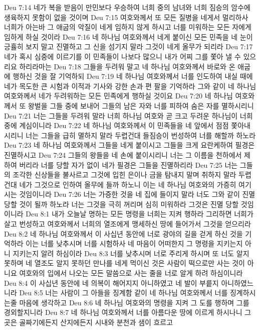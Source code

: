 Deu 7:14  네가 복을 받음이 만민보다 우승하여 너희 중의 남녀와 너희 짐승의 암수에 생육하지 못함이 없을 것이며
Deu 7:15  여호와께서 또 모든 질병을 네게서 멀리하사 너희가 아는바 그 애굽의 악질이 네게 임하지 않게 하시고 너를 미워하는 모든 자에게 임하게 하실 것이라
Deu 7:16  네 하나님 여호와께서 네게 붙이신 모든 민족을 네 눈이 긍휼히 보지 말고 진멸하고 그 신을 섬기지 말라 그것이 네게 올무가 되리라
Deu 7:17  네가 혹시 심중에 이르기를 이 민족들이 나보다 많으니 내가 어찌 그를 쫓아 낼 수 있으리요 하리라마는
Deu 7:18  그들을 두려워 말고 네 하나님 여호와께서 바로와 온 애굽에 행하신 것을 잘 기억하되
Deu 7:19  네 하나님 여호와께서 너를 인도하여 내실 때에 네가 목도한 큰 시험과 이적과 기사와 강한 손과 편 팔을 기억하라 그와 같이 네 하나님 여호와께서 네가 두려워하는 모든 민족에게 행하실 것이요
Deu 7:20  네 하나님 여호와께서 또 왕벌을 그들 중에 보내어 그들의 남은 자와 너를 피하여 숨은 자를 멸하시리니
Deu 7:21  너는 그들을 두려워 말라 너희 하나님 여호와 곧 크고 두려운 하나님이 너희 중에 계심이니라
Deu 7:22  네 하나님 여호와께서 이 민족들을 네 앞에서 점점 쫓아내시리니 너는 그들을 급히 멸하지 말라 두렵건대 들짐승이 번성하여 너를 해할까 하노라
Deu 7:23  네 하나님 여호와께서 그들을 네게 붙이시고 그들을 크게 요란케하여 필경은 진멸하시고
Deu 7:24  그들의 왕들을 네 손에 붙이시리니 너는 그 이름을 천하에서 제하여 버리라 너를 당할 자가 없이 네가 필경은 그들을 진멸하리라
Deu 7:25  너는 그들의 조각한 신상들을 불사르고 그것에 입힌 은이나 금을 탐내지 말며 취하지 말라 두렵건대 네가 그것으로 인하여 올무에 들까 하노니 이는 네 하나님 여호와의 가증히 여기시는 것임이니라
Deu 7:26  너는 가증한 것을 네 집에 들이지 말라 너도 그와 같이 진멸 당할 것이 될까 하노라 너는 그것을 극히 꺼리며 심히 미워하라 그것은 진멸 당할 것임이니라
Deu 8:1  내가 오늘날 명하는 모든 명령을 너희는 지켜 행하라 그리하면 너희가 살고 번성하고 여호와께서 너희의 열조에게 맹세하신 땅에 들어가서 그것을 얻으리라
Deu 8:2  네 하나님 여호와께서 이 사십년 동안에 너로 광야의 길을 걷게 하신 것을 기억하라 이는 너를 낮추시며 너를 시험하사 네 마음이 어떠한지 그 명령을 지키는지 아니 지키는지 알려 하심이라
Deu 8:3  너를 낮추시며 너로 주리게 하시며 또 너도 알지 못하며 네 열조도 알지 못하던 만나를 네게 먹이신 것은 사람이 떡으로만 사는 것이 아니요 여호와의 입에서 나오는 모든 말씀으로 사는 줄을 너로 알게 하려 하심이니라
Deu 8:4  이 사십년 동안에 네 의복이 해어지지 아니하였고 네 발이 부릍지 아니하였느니라
Deu 8:5  너는 사람이 그 아들을 징계함 같이 네 하나님 여호와께서 너를 징계하시는줄 마음에 생각하고
Deu 8:6  네 하나님 여호와의 명령을 지켜 그 도를 행하며 그를 경외할지니라
Deu 8:7  네 하나님 여호와께서 너를 아름다운 땅에 이르게 하시나니 그곳은 골짜기에든지 산지에든지 시내와 분천과 샘이 흐르고
